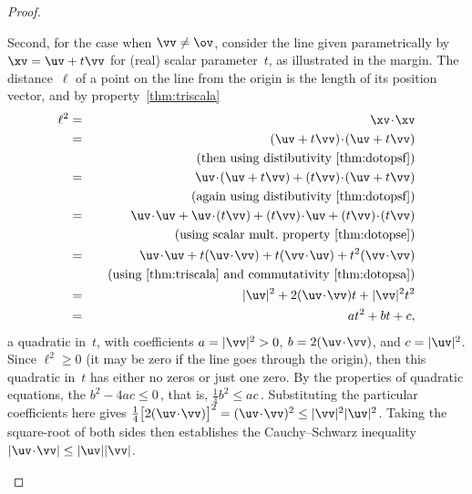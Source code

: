 \begin{proof}
\begin{itemize}
Second, for the case when \(\vv\neq\ov\), consider the line given parametrically by \(\xv=\uv+t\vv\) for (real) scalar parameter~\(t\), as illustrated in the margin.
%
The distance~\(\ell\) of a point on the line from the origin is the length of its position vector, and by property~\ref{thm:triscala}
\begin{eqnarray*}
\ell^2&=&\xv\cdot\xv
\\&=&(\uv+t\vv)\cdot(\uv+t\vv)
\\&&\quad(\text{then using distibutivity~\ref{thm:dotopsf}})
\\&=&\uv\cdot(\uv+t\vv)+(t\vv)\cdot(\uv+t\vv)
\\&&\quad(\text{again using distibutivity~\ref{thm:dotopsf}})
\\&=&\uv\cdot\uv+\uv\cdot(t\vv)+(t\vv)\cdot\uv+(t\vv)\cdot(t\vv)
\\&&\quad(\text{using scalar mult.\ property~\ref{thm:dotopse}})
\\&=&\uv\cdot\uv+t(\uv\cdot\vv)+t(\vv\cdot\uv)+t^2(\vv\cdot\vv)
\\&&\quad(\text{using~\ref{thm:triscala} and commutativity~\ref{thm:dotopsa}})
\\&=&|\uv|^2+2(\uv\cdot\vv)t+|\vv|^2t^2
\\&=&at^2+bt+c,
\end{eqnarray*}
a quadratic in~\(t\), with coefficients \(a=|\vv|^2>0\), \(b=2(\uv\cdot\vv)\), and \(c=|\uv|^2\).
Since \(\ell^2\geq0\) (it may be zero if the line goes through the origin), then this quadratic in~\(t\) has either no zeros or just one zero.
By the properties of quadratic equations, the  \(b^2-4ac\leq0\)\,, that is, \(\tfrac14b^2\leq ac\)\,.
Substituting the particular coefficients here gives 
\(\tfrac14\big[2(\uv\cdot\vv)\big]^2=(\uv\cdot\vv)^2\leq|\vv|^2|\uv|^2\).
Taking the square-root of both sides then establishes the Cauchy--Schwarz inequality  \(|\uv\cdot\vv|\leq|\uv||\vv|\).


\end{itemize}
\end{proof}

